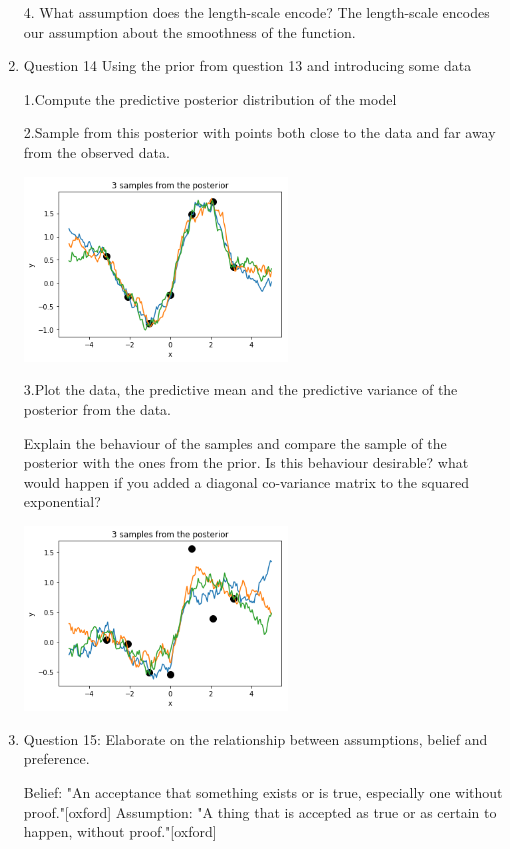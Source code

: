 \documentclass[13pt]{article}
\begin{document}
\begin{enumerate}
  4. What assumption does the length-scale encode?
   The length-scale encodes our assumption about the smoothness of the function.
  
  \item{\large Question 14}
  Using the prior from question 13 and introducing some data 
  
 1.Compute the predictive posterior distribution of the model
 
 2.Sample from this posterior with points both close to the data and far away from the observed data.
 
 \includegraphics[width=70mm, scale=0.5]{images/GPPosteriorNoFudge.png}
 
 3.Plot the data, the predictive mean and the predictive variance of the posterior from the data.
 
 Explain the behaviour of the samples and compare the sample of the posterior with the ones from the prior. Is this behaviour desirable? what would happen if you added a diagonal co-variance matrix to the squared exponential?
 
 \includegraphics[width=70mm, scale=0.5]{images/GPPosterior.png}
  
  \item{\large Question 15: Elaborate on the relationship between assumptions, belief and preference.}
  
  Belief: "An acceptance that something exists or is true, especially one without proof."[oxford]\newline
  Assumption: "A thing that is accepted as true or as certain to happen, without proof."[oxford]
  

\end{enumerate}
\end{document}
